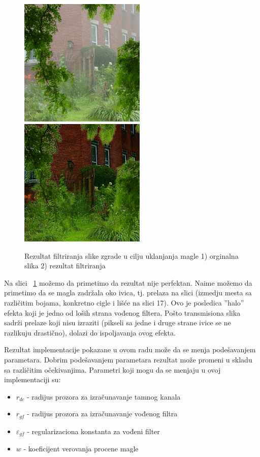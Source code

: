 \documentclass[a4paper,12pt,titlepage]{article}
\begin{document}
\begin{figure}[ht!]
\centering
\includegraphics[width=60mm]{img/haze.png}
\includegraphics[width=60mm]{img/hazeRes.png}
\caption{Rezultat filtriranja slike zgrade u cilju uklanjanja magle 1) orginalna slika 2) rezultat filtriranja}
\label{dehaze}
\end{figure}   

Na slici ~\ref{dehaze} možemo da primetimo da rezultat nije perfektan. Naime možemo da primetimo da se magla zadržala oko ivica, tj. prelaza na slici (izmedju mesta sa različitim bojama, konkretno cigle i lišće na slici 17). Ovo je posledica ''halo'' efekta koji je jedno od loših strana vođenog filtera. Pošto transmisiona slika sadrži prelaze koji nisu izraziti (pikseli sa jedne i druge strane ivice se ne razlikuju drastično), dolazi do ispoljavanja ovog efekta.

Rezultat implementacije pokazane u ovom radu može da se menja podešavanjem parametara. Dobrim podešavanjem parametara rezultat može promeni u skladu sa različitim očekivanjima. Parametri koji mogu da se menjaju u ovoj implementaciji su:

\newpage
\begin{itemize}
\item $r_{dc}$ - radijus prozora za izračunavanje tamnog kanala 
\item $r_{gf}$ - radijus prozora za izračunavanje vođenog filtra
\item $\varepsilon_{gf}$ - regularizaciona konstanta za vođeni filter 
\item $w$ - koeficijent verovanja procene magle
\end{itemize}
\end{document}
